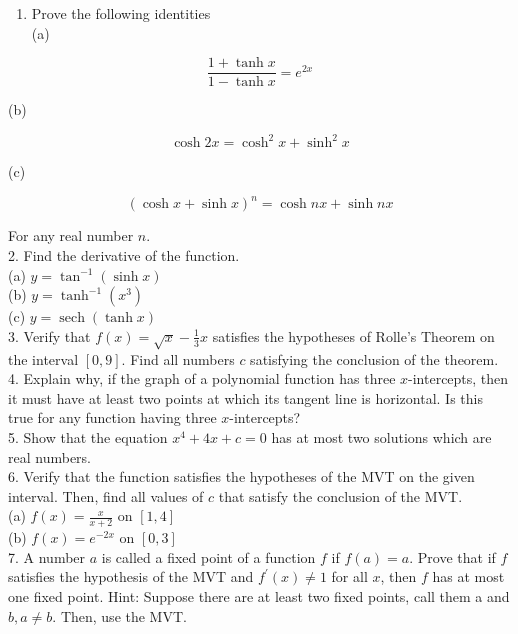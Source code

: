 \documentclass[10pt]{article}
\begin{document}
\begin{enumerate}
  \item Prove the following identities\\
(a)
\end{enumerate}

$$
\frac{1+\tanh x}{1-\tanh x}=e^{2 x}
$$

(b)

$$
\cosh 2 x=\cosh ^{2} x+\sinh ^{2} x
$$

(c)

$$
(\cosh x+\sinh x)^{n}=\cosh n x+\sinh n x
$$

For any real number $n$.\\
2. Find the derivative of the function.\\
(a) $y=\tan ^{-1}(\sinh x)$\\
(b) $y=\tanh ^{-1}\left(x^{3}\right)$\\
(c) $y=\operatorname{sech}(\tanh x)$\\
3. Verify that $f(x)=\sqrt{x}-\frac{1}{3} x$ satisfies the hypotheses of Rolle's Theorem on the interval $[0,9]$. Find all numbers $c$ satisfying the conclusion of the theorem.\\
4. Explain why, if the graph of a polynomial function has three $x$-intercepts, then it must have at least two points at which its tangent line is horizontal. Is this true for any function having three $x$-intercepts?\\
5. Show that the equation $x^{4}+4 x+c=0$ has at most two solutions which are real numbers.\\
6. Verify that the function satisfies the hypotheses of the MVT on the given interval. Then, find all values of $c$ that satisfy the conclusion of the MVT.\\
(a) $f(x)=\frac{x}{x+2}$ on $[1,4]$\\
(b) $f(x)=e^{-2 x}$ on $[0,3]$\\
7. A number $a$ is called a fixed point of a function $f$ if $f(a)=a$. Prove that if $f$ satisfies the hypothesis of the MVT and $f^{\prime}(x) \neq 1$ for all $x$, then $f$ has at most one fixed point. Hint: Suppose there are at least two fixed points, call them a and $b, a \neq b$. Then, use the MVT.
\end{document}
